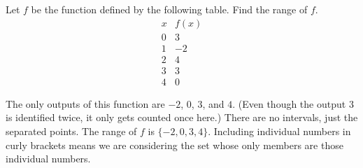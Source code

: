 \documentclass[nooutcomes]{ximera}
\begin{document}
	\begin{example}
		Let $f$ be the function defined by the following table. Find the range of $f$.
		$$ \begin{array}{c|c}
			  x & f(x)\\\hline
			  0 & 3\\
			  1 & -2\\
			  2 & 4\\
			  3 & 3\\
			  4 & 0
		\end{array}$$

		\begin{explanation}

			The only outputs of this function are $-2$, $0$, $3$, and $4$. 
			(Even though the output $3$ is identified twice, it only gets counted once here.) 
			There are no intervals, just the separated points. The range of $f$ is $\{ -2, 0, 3, 4 \}$. Including individual numbers in curly brackets means we are considering the set 					whose only members are those individual numbers. 
		\end{explanation}	
	\end{example}
	
\end{document}

